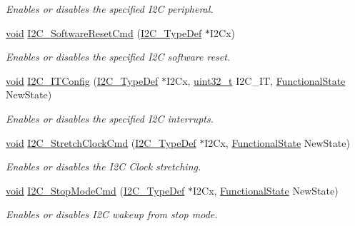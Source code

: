 \begin{DoxyCompactItemize}
\begin{DoxyCompactList}\small\item\em Enables or disables the specified I2\-C peripheral. \end{DoxyCompactList}\item 
\hyperlink{group___n_a_m_e_ga18028b8badbf1ea7e704ccac3c488e82}{void} \hyperlink{group___i2_c___group1_gaeee2878e8d1a8448387ded503efefda8}{I2\-C\-\_\-\-Software\-Reset\-Cmd} (\hyperlink{struct_i2_c___type_def}{I2\-C\-\_\-\-Type\-Def} $\ast$I2\-Cx)
\begin{DoxyCompactList}\small\item\em Enables or disables the specified I2\-C software reset. \end{DoxyCompactList}\item 
\hyperlink{group___n_a_m_e_ga18028b8badbf1ea7e704ccac3c488e82}{void} \hyperlink{group___i2_c___group1_ga63c11e12738c61b66b72a2604a86a178}{I2\-C\-\_\-\-I\-T\-Config} (\hyperlink{struct_i2_c___type_def}{I2\-C\-\_\-\-Type\-Def} $\ast$I2\-Cx, \hyperlink{stdint_8h_a435d1572bf3f880d55459d9805097f62}{uint32\-\_\-t} I2\-C\-\_\-\-I\-T, \hyperlink{group___exported__types_gac9a7e9a35d2513ec15c3b537aaa4fba1}{Functional\-State} New\-State)
\begin{DoxyCompactList}\small\item\em Enables or disables the specified I2\-C interrupts. \end{DoxyCompactList}\item 
\hyperlink{group___n_a_m_e_ga18028b8badbf1ea7e704ccac3c488e82}{void} \hyperlink{group___i2_c___group1_ga7459feb3b1dfcd3e4f6574002ca7d3bd}{I2\-C\-\_\-\-Stretch\-Clock\-Cmd} (\hyperlink{struct_i2_c___type_def}{I2\-C\-\_\-\-Type\-Def} $\ast$I2\-Cx, \hyperlink{group___exported__types_gac9a7e9a35d2513ec15c3b537aaa4fba1}{Functional\-State} New\-State)
\begin{DoxyCompactList}\small\item\em Enables or disables the I2\-C Clock stretching. \end{DoxyCompactList}\item 
\hyperlink{group___n_a_m_e_ga18028b8badbf1ea7e704ccac3c488e82}{void} \hyperlink{group___i2_c___group1_ga2dc4c17cc27929bed2621e4bf5064a57}{I2\-C\-\_\-\-Stop\-Mode\-Cmd} (\hyperlink{struct_i2_c___type_def}{I2\-C\-\_\-\-Type\-Def} $\ast$I2\-Cx, \hyperlink{group___exported__types_gac9a7e9a35d2513ec15c3b537aaa4fba1}{Functional\-State} New\-State)
\begin{DoxyCompactList}\small\item\em Enables or disables I2\-C wakeup from stop mode. \end{DoxyCompactList}\item 

\end{DoxyCompactItemize}
